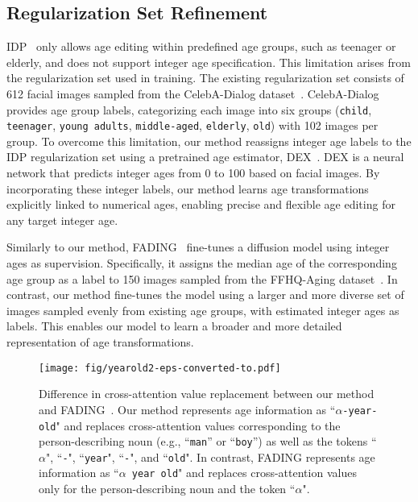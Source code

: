 \subsection{Regularization Set Refinement
}
\label{sec:int_age}

IDP~\cite{banerjee2023identity} only allows age editing within predefined age groups, such as teenager or elderly, and does not support integer age specification.
This limitation arises from the regularization set used in training.
The existing regularization set consists of 612 facial images sampled from the CelebA-Dialog dataset~\cite{jiang2021talk}.
CelebA-Dialog provides age group labels, categorizing each image into six groups (\texttt{child}, \texttt{teenager}, \texttt{young adults}, \texttt{middle-aged}, \texttt{elderly}, \texttt{old}) with 102 images per group.
To overcome this limitation, our method reassigns integer age labels to the IDP regularization set using a pretrained age estimator, DEX~\cite{rothe2015dex}.
DEX is a neural network that predicts integer ages from 0 to 100 based on facial images.
By incorporating these integer labels, our method learns age transformations explicitly linked to numerical ages, enabling precise and flexible age editing for any target integer age.

Similarly to our method, FADING~\cite{chen2023face} fine-tunes a diffusion model using integer ages as supervision. Specifically, it assigns the median age of the corresponding age group as a label to 150 images sampled from the FFHQ-Aging dataset~\cite{or2020lifespan}.
In contrast, our method fine-tunes the model using a larger and more diverse set of images sampled evenly from existing age groups, with estimated integer ages as labels.
This enables our model to learn a broader and more detailed representation of age transformations.

\begin{figure}
  \centering
  \texttt{[image: fig/yearold2-eps-converted-to.pdf]}
  \caption{
  Difference in cross-attention value replacement between our method and FADING~\cite{chen2023face}. Our method represents age information as ``\texttt{$\alpha$-year-old}" and replaces cross-attention values corresponding to the person-describing noun (e.g., ``\texttt{man}'' or ``\texttt{boy}'') as well as the tokens ``\texttt{$\alpha$}", ``\texttt{-}", ``\texttt{year}", ``\texttt{-}", and ``\texttt{old}". In contrast, FADING represents age information as ``\texttt{$\alpha$ year old}" and replaces cross-attention values only for the person-describing noun and the token ``\texttt{$\alpha$}".
  }
  \label{fig:yearold}
\end{figure}


